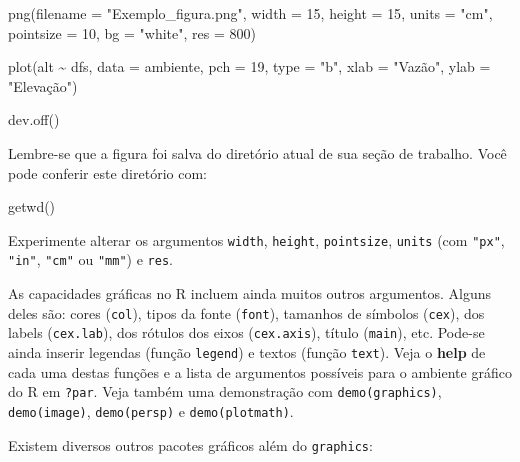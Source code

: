 \documentclass[
]{book}
\newenvironment{Shaded}{\begin{snugshade}}{\end{snugshade}}
\newcommand{\AttributeTok}[1]{\textcolor[rgb]{0.77,0.63,0.00}{#1}}
\newcommand{\DecValTok}[1]{\textcolor[rgb]{0.00,0.00,0.81}{#1}}
\newcommand{\FunctionTok}[1]{\textcolor[rgb]{0.00,0.00,0.00}{#1}}
\newcommand{\NormalTok}[1]{#1}
\newcommand{\SpecialCharTok}[1]{\textcolor[rgb]{0.00,0.00,0.00}{#1}}
\newcommand{\StringTok}[1]{\textcolor[rgb]{0.31,0.60,0.02}{#1}}
\begin{document}
\begin{Shaded}
\begin{Highlighting}[]
\FunctionTok{png}\NormalTok{(}\AttributeTok{filename =} \StringTok{"Exemplo\_figura.png"}\NormalTok{,}
    \AttributeTok{width =} \DecValTok{15}\NormalTok{, }\AttributeTok{height =} \DecValTok{15}\NormalTok{, }\AttributeTok{units =} \StringTok{"cm"}\NormalTok{, }
    \AttributeTok{pointsize =} \DecValTok{10}\NormalTok{, }\AttributeTok{bg =} \StringTok{"white"}\NormalTok{, }\AttributeTok{res =} \DecValTok{800}\NormalTok{)}

\FunctionTok{plot}\NormalTok{(alt }\SpecialCharTok{\textasciitilde{}}\NormalTok{ dfs, }\AttributeTok{data =}\NormalTok{ ambiente, }\AttributeTok{pch =} \DecValTok{19}\NormalTok{, }\AttributeTok{type =} \StringTok{"b"}\NormalTok{, }
     \AttributeTok{xlab =} \StringTok{"Vazão"}\NormalTok{, }\AttributeTok{ylab =} \StringTok{"Elevação"}\NormalTok{)}

\FunctionTok{dev.off}\NormalTok{()}
\end{Highlighting}
\end{Shaded}

Lembre-se que a figura foi salva do diretório atual de sua seção de trabalho. Você pode conferir este diretório com:

\begin{Shaded}
\begin{Highlighting}[]
\FunctionTok{getwd}\NormalTok{()}
\end{Highlighting}
\end{Shaded}

Experimente alterar os argumentos \texttt{width}, \texttt{height}, \texttt{pointsize}, \texttt{units} (com \texttt{"px"}, \texttt{"in"}, \texttt{"cm"} ou \texttt{"mm"}) e \texttt{res}.

As capacidades gráficas no R incluem ainda muitos outros argumentos. Alguns deles são: cores (\texttt{col}), tipos da fonte (\texttt{font}), tamanhos de símbolos (\texttt{cex}), dos labels (\texttt{cex.lab}), dos rótulos dos eixos (\texttt{cex.axis}), título (\texttt{main}), etc. Pode-se ainda inserir legendas (função \texttt{legend}) e textos (função \texttt{text}). Veja o \textbf{help} de cada uma destas funções e a lista de argumentos possíveis para o ambiente gráfico do R em \texttt{?par}. Veja também uma demonstração com \texttt{demo(graphics)}, \texttt{demo(image)}, \texttt{demo(persp)} e \texttt{demo(plotmath)}.

Existem diversos outros pacotes gráficos além do \texttt{graphics}:
\end{document}
